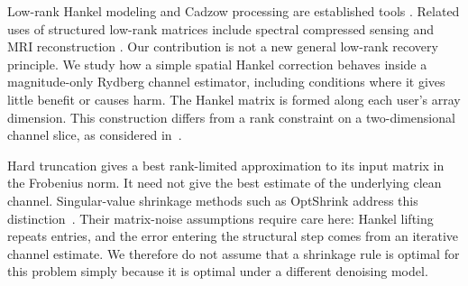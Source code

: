
Low-rank Hankel modeling and Cadzow processing are established tools
\cite{cadzow1988,markovsky2008}. Related uses of structured low-rank
matrices include spectral compressed sensing and MRI reconstruction
\cite{chen2014emac,jin2016aloha,haldar2014loraks}. Our contribution is not
a new general low-rank recovery principle. We study how a simple spatial
Hankel correction behaves inside a magnitude-only Rydberg channel
estimator, including conditions where it gives little benefit or causes
harm. The Hankel matrix is formed along each user's array dimension.
This construction differs from a rank constraint on a two-dimensional
channel slice, as considered in~\cite{xu2025}.

Hard truncation gives a best rank-limited approximation to its input
matrix in the Frobenius norm. It need not give the best estimate of the
underlying clean channel. Singular-value shrinkage methods such as
OptShrink address this distinction~\cite{nadakuditi2014optshrink}. Their
matrix-noise assumptions require care here: Hankel lifting repeats
entries, and the error entering the structural step comes from an
iterative channel estimate. We therefore do not assume that a shrinkage
rule is optimal for this problem simply because it is optimal under a
different denoising model.
